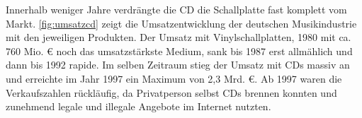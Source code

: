 Innerhalb weniger Jahre verdrängte die CD die Schallplatte fast komplett vom
Markt. \autoref{fig:umsatzcd} zeigt die Umsatzentwicklung der deutschen
Musikindustrie mit den jeweiligen Produkten. Der Umsatz mit Vinylschallplatten,
1980 mit ca. 760 Mio. \euro{} noch das umsatzstärkste Medium, sank bis 1987 erst
all­mäh­lich und dann bis 1992 rapide. Im selben Zeitraum stieg der Umsatz mit
CDs massiv an und erreichte im Jahr 1997 ein Maximum von 2,3 Mrd. \euro{}. Ab
1997 waren die Verkaufszahlen rückläufig, da Privatperson selbst CDs \glqq
brennen\grqq{} konnten und zunehmend legale und illegale Angebote im Internet
nutzten.

